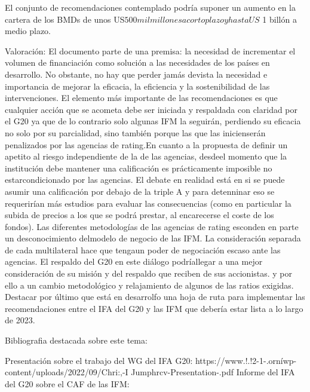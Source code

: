 \documentclass[10pt,a4paper]{article}
\begin{document}
El conjunto de recomendaciones contemplado podría suponer un aumento en la cartera de los BMDs de unos US$ 500 mil millones a corto plazo y hasta US$ 1 billón a medio plazo.

Valoración: 
El documento parte de una premisa: la necesidad de incrementar el volumen de financiación como solución a las necesidades de los países en desarrollo. No obstante, no hay que perder jamás devista la necesidad e importancia de mejorar la eficacia, la eficiencia y la sostenibilidad de las intervenciones. El elemento más importante de las recomendaciones es que cualquier acción que se acometa debe ser iniciada y respaldada con claridad por el G20 ya que de lo contrario solo algunas IFM la seguirán, perdiendo su eficacia no solo por su parcialidad, sino también porque las que las inicienserán penalizados por las agencias de rating.En cuanto a la propuesta de definir un apetito al riesgo independiente de la de las agencias, desdeel momento que la institución debe mantener una calificación es prácticamente imposible no estarcondicionado por las agencias. El debate en realidad está en si se puede asumir una calificación por debajo de la triple A y para detenninar eso se requerirían más estudios para evaluar las consecuencias (como en particular la subida de precios a los que se podrá prestar, al encarecerse el coste de los fondos). Las diferentes metodologías de las agencias de rating esconden en parte un desconocimiento delmodelo de negocio de las IFM. La consideración separada de cada multilateral hace que tengaun poder de negociación escaso ante las agencias. El respaldo del G20 en este diálogo podríallegar a una mejor consideración de su misión y del respaldo que reciben de sus accionistas. y por ello a un cambio metodológico y relajamiento de algunos de las ratios exigidas. Destacar por último que está en desarrolfo una hoja de ruta para implementar las recomendaciones entre el IFA del G20 y las IFM que debería estar lista a lo largo de 2023. 

Bibliografia destacada sobre este tema: 

Presentación sobre el trabajo del WG del IFA G20: https://www.!.!2-1-.orníwp-content/uploads/2022/09/Chri:,-I Jumphrcv-Presentation-.pdf Informe del IFA del G20 sobre el CAF de las IFM:
\end{document}
